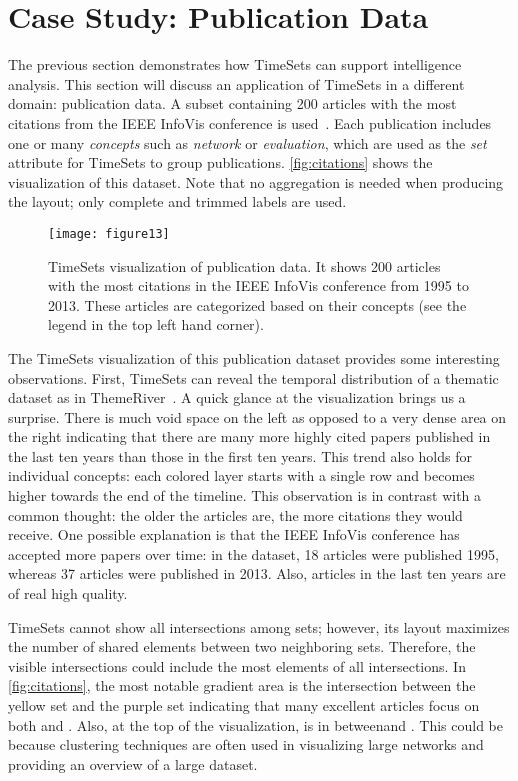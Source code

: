 \section{Case Study: Publication Data}
\label{sub:ts-pub}
The previous section demonstrates how TimeSets can support intelligence analysis. This section will discuss an application of TimeSets in a different domain: publication data. A subset containing 200 articles with the most citations from the IEEE InfoVis conference is used~\cite{Stasko2013}. Each publication includes one or many \emph{concepts} such as \emph{network} or \emph{evaluation}, which are used as the \emph{set} attribute for TimeSets to group publications. \autoref{fig:citations} shows the visualization of this dataset. Note that no aggregation is needed when producing the layout; only complete and trimmed labels are used.

\begin{figure}[!htb]
\centering
\texttt{[image: figure13]}
\caption{TimeSets visualization of publication data. It shows 200 articles with the most citations in the IEEE InfoVis conference from 1995 to 2013. These articles are categorized based on their concepts (see the legend in the top left hand corner).}
\label{fig:citations}
\end{figure}

The TimeSets visualization of this publication dataset provides some interesting observations. First, TimeSets can reveal the temporal distribution of a thematic dataset as in ThemeRiver~\cite{Havre2002}. A quick glance at the visualization brings us a surprise. There is much void space on the left as opposed to a very dense area on the right indicating that there are many more highly cited papers published in the last ten years than those in the first ten years. This trend also holds for individual concepts: each colored layer starts with a single row and becomes higher towards the end of the timeline. This observation is in contrast with a common thought: the older the articles are, the more citations they would receive. One possible explanation is that the IEEE InfoVis conference has accepted more papers over time: in the dataset, 18 articles were published 1995, whereas 37 articles were published in 2013. Also, articles in the last ten years are of real high quality.

TimeSets cannot show all intersections among sets; however,  its layout maximizes the number of shared elements between two neighboring sets. Therefore, the visible intersections could include the most elements of all intersections. In \autoref{fig:citations}, the most notable gradient area is the intersection between the yellow set and the purple set indicating that many excellent articles focus on both \tsevaluation{} and \tsinteraction. Also, at the top of the visualization, \tsclustering{} is in between\tsnetwork and \tsoverview{}. This could be because clustering techniques are often used in visualizing large networks and providing an overview of a large dataset.

